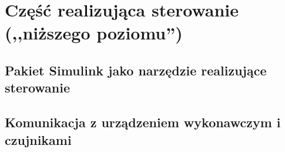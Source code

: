 \section{Część realizująca sterowanie (,,niższego poziomu'')}
\label{sec:czesc-nizsza}


\subsection{Pakiet Simulink jako narzędzie realizujące sterowanie}
\label{sub:czesc-nizsza-matlab}


\subsection{Komunikacja z urządzeniem wykonawczym i czujnikami}
\label{sub:czesc-nizsza-komunikacja}
